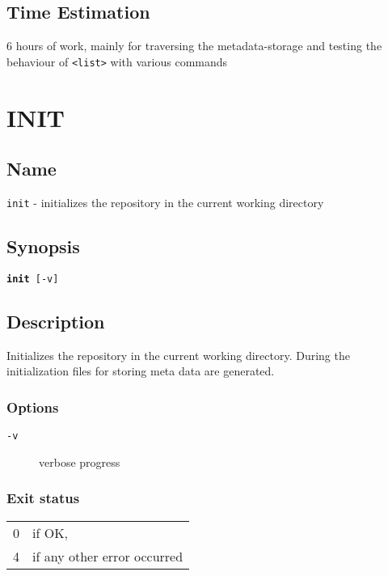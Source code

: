 \documentclass{article} %
\begin{document}
				\subsection*{Time Estimation}
				6 hours of work, mainly for traversing the metadata-storage and testing the behaviour of \texttt{<list>} with various commands \\
				\noindent
		\newpage
		
		\section*{INIT}
		\subsection*{Name}
		\texttt{init} - initializes the repository in the current working directory
		\subsection*{Synopsis}
		\texttt{\textbf{init} [-v]}
		\subsection*{Description}
		Initializes the repository in the current working directory.
		During the initialization files for storing meta data are generated.\\
		
		\noindent
		\subsubsection*{Options}
		\begin{description}
			\item[\texttt{-v}] verbose progress
		\end{description}
		
		\subsubsection*{Exit status}
		\begin{tabular}{ll}
			0 &  if OK,\\ 
			4 &  if any other error occurred\\
		\end{tabular}
\end{document}
